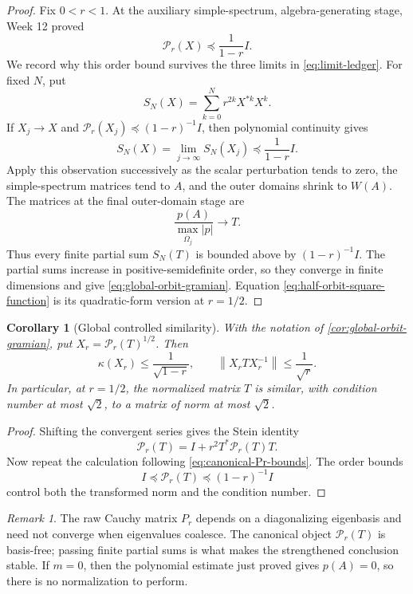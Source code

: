 \documentclass[11pt,oneside,openany]{book}
\newtheorem{corollary}[theorem]{Corollary}
\theoremstyle{definition}
\theoremstyle{remark}
\newtheorem{remark}[theorem]{Remark}
\newcommand{\norm}[1]{\left\lVert #1\right\rVert}
\begin{document}
\begin{proof}
Fix \(0<r<1\).  At the auxiliary simple-spectrum,
algebra-generating stage, Week 12
proved
\[
  \mathcal P_r(X)\preceq\frac1{1-r}I.
\]
We record why this order bound survives the three limits in
\eqref{eq:limit-ledger}.  For fixed \(N\), put
\[
  S_N(X)=\sum_{k=0}^{N}r^{2k}X^{*k}X^k.
\]
If \(X_j\to X\) and
\(\mathcal P_r(X_j)\preceq(1-r)^{-1}I\), then polynomial continuity
gives
\[
  S_N(X)
  =
  \lim_{j\to\infty}S_N(X_j)
  \preceq\frac1{1-r}I.
\]
Apply this observation successively as the scalar perturbation tends
to zero, the simple-spectrum matrices tend to \(A\), and the outer
domains shrink to \(W(A)\).  The matrices at the final outer-domain
stage are
\[
  \frac{p(A)}
       {\max_{\overline\Omega_j}|p|}
  \longrightarrow T.
\]
Thus every finite partial sum \(S_N(T)\) is bounded above by
\((1-r)^{-1}I\).  The partial sums increase in positive-semidefinite
order, so they converge in finite dimensions and give
\eqref{eq:global-orbit-gramian}.  Equation
\eqref{eq:half-orbit-square-function} is its quadratic-form version
at \(r=1/2\).
\end{proof}

\begin{corollary}[Global controlled similarity]
\label{cor:global-controlled-similarity}
With the notation of \cref{cor:global-orbit-gramian}, put
\(X_r=\mathcal P_r(T)^{1/2}\).  Then
\[
  \kappa(X_r)\leq\frac1{\sqrt{1-r}},
  \qquad
  \norm{X_rTX_r^{-1}}\leq\frac1{\sqrt r}.
\]
In particular, at \(r=1/2\), the normalized matrix \(T\) is similar,
with condition number at most \(\sqrt2\), to a matrix of norm at most
\(\sqrt2\).
\end{corollary}

\begin{proof}
Shifting the convergent series gives the Stein identity
\[
  \mathcal P_r(T)
  =
  I+r^2T^*\mathcal P_r(T)T.
\]
Now repeat the calculation following
\eqref{eq:canonical-Pr-bounds}.  The order bounds
\[
  I\preceq\mathcal P_r(T)\preceq(1-r)^{-1}I
\]
control both the transformed norm and the condition number.
\end{proof}

\begin{remark}
The raw Cauchy matrix \(P_r\) depends on a diagonalizing eigenbasis and
need not converge when eigenvalues coalesce.  The canonical object
\(\mathcal P_r(T)\) is basis-free; passing finite partial sums is what
makes the strengthened conclusion stable.  If \(m=0\), then
the polynomial estimate just proved gives \(p(A)=0\), so there is no
normalization to perform.
\end{remark}
\end{document}
